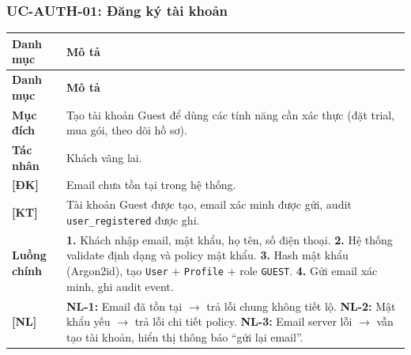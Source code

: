\subsubsection{UC-AUTH-01: Đăng ký tài khoản}
\begingroup
\renewcommand{\arraystretch}{1.3}
\begin{longtable}{|>{\centering\arraybackslash}m{3cm}|>{\raggedright\arraybackslash}m{12cm}|}
\hline
\textbf{Danh mục} & \textbf{Mô tả} \\ \hline
\endfirsthead
\hline
\textbf{Danh mục} & \textbf{Mô tả} \\ \hline
\endhead
\hline
\endfoot
\textbf{Mục đích} & Tạo tài khoản Guest để dùng các tính năng cần xác thực (đặt trial, mua gói, theo dõi hồ sơ). \\
\hline
\textbf{Tác nhân} & Khách vãng lai. \\
\hline
\textbf{[ĐK]} & Email chưa tồn tại trong hệ thống. \\
\hline
\textbf{[KT]} & Tài khoản Guest được tạo, email xác minh được gửi, audit \texttt{user\_registered} được ghi. \\
\hline
\textbf{Luồng chính} & \textbf{1.} Khách nhập email, mật khẩu, họ tên, số điện thoại. \textbf{2.} Hệ thống validate định dạng và policy mật khẩu. \textbf{3.} Hash mật khẩu (Argon2id), tạo \texttt{User} + \texttt{Profile} + role \texttt{GUEST}. \textbf{4.} Gửi email xác minh, ghi audit event. \\
\hline
\textbf{[NL]} & \textbf{NL-1:} Email đã tồn tại $\rightarrow$ trả lỗi chung không tiết lộ. \textbf{NL-2:} Mật khẩu yếu $\rightarrow$ trả lỗi chi tiết policy. \textbf{NL-3:} Email server lỗi $\rightarrow$ vẫn tạo tài khoản, hiển thị thông báo ``gửi lại email''. \\
\hline
\end{longtable}
\endgroup

